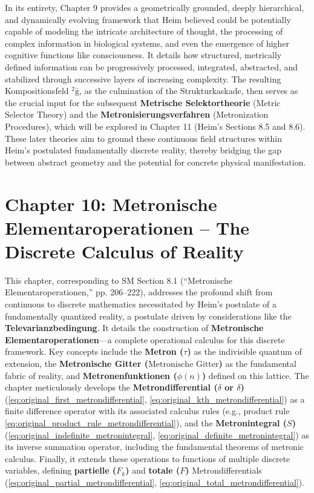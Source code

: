 \documentclass[12pt]{article}
\newcommand{\q}[1]{\enquote{#1}}
\newcommand{\kompositionsfeld}{{}^2\bar{\mathrm{g}}}
\newcommand{\metron}{\tau}
\newcommand{\metronischegitter}{\text{Metronische Gitter}}
\newcommand{\metrondifferential}{\delta}
\newcommand{\metronintegral}{S}
\newcommand{\metronenfunktion}{\phi(n)}
\begin{document}
In its entirety, Chapter 9 provides a geometrically grounded, deeply hierarchical, and dynamically evolving framework that Heim believed could be potentially capable of modeling the intricate architecture of thought, the processing of complex information in biological systems, and even the emergence of higher cognitive functions like consciousness. It details how structured, metrically defined information can be progressively processed, integrated, abstracted, and stabilized through successive layers of increasing complexity. The resulting Kompositionsfeld \( \kompositionsfeld \), as the culmination of the Strukturkaskade, then serves as the crucial input for the subsequent \textbf{Metrische Selektortheorie} (Metric Selector Theory) and the \textbf{Metronisierungsverfahren} (Metronization Procedures), which will be explored in Chapter 11 (Heim's Sections 8.5 and 8.6). These later theories aim to ground these continuous field structures within Heim’s postulated fundamentally discrete reality, thereby bridging the gap between abstract geometry and the potential for concrete physical manifestation.

\clearpage 
\section{Chapter 10: Metronische Elementaroperationen – The Discrete Calculus of Reality}
\label{sec:chapter10}

This chapter, corresponding to SM Section 8.1 (\q{Metronische Elementaroperationen,} pp. 206–222), addresses the profound shift from continuous to discrete mathematics necessitated by Heim's postulate of a fundamentally quantized reality, a postulate driven by considerations like the \textbf{Televarianzbedingung}. It details the construction of \textbf{Metronische Elementaroperationen}—a complete operational calculus for this discrete framework. Key concepts include the \textbf{Metron (\(\metron\))} as the indivisible quantum of extension, the \textbf{Metronische Gitter (\(\metronischegitter\))} as the fundamental fabric of reality, and \textbf{Metronenfunktionen (\(\metronenfunktion\))} defined on this lattice. The chapter meticulously develops the \textbf{Metrondifferential (\(\metrondifferential\) or \( \delta \))} (\eqref{eq:original_first_metrondifferential}, \eqref{eq:original_kth_metrondifferential}) as a finite difference operator with its associated calculus rules (e.g., product rule \eqref{eq:original_product_rule_metrondifferential}), and the \textbf{Metronintegral (\(\metronintegral\))} (\eqref{eq:original_indefinite_metronintegral}, \eqref{eq:original_definite_metronintegral}) as its inverse summation operator, including the fundamental theorems of metronic calculus. Finally, it extends these operations to functions of multiple discrete variables, defining \textbf{partielle (\(F_k\))} and \textbf{totale (\(F\))} Metrondifferentials (\eqref{eq:original_partial_metrondifferential}, \eqref{eq:original_total_metrondifferential}).
\end{document}
